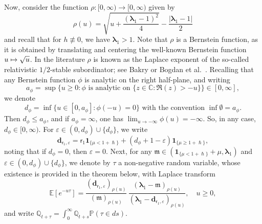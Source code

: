 \documentclass[10pt]{amsart}
\let\epsilon\varepsilon
\newcommand\mto{\mathchoice{\longmapsto}{\mapsto}{\mapsto}{\mapsto}}
\theoremstyle{plain}
\theoremstyle{definition}
\newcommand{\E}{\mathbb{E}}
\newcommand{\Prob}{\mathbb{P}}
\newcommand{\J}{\mathds{Q}}
\newcommand{\m}{\mathfrak{m}}
\newcommand{\dpt}{\bm{d}_{\vat,\epsilon}}
\newcommand{\dph}{(d_\phi+1-\epsilon)}
\newcommand{\lam}{{\bm{\lambda}_1}}
\newcommand{\vat}{{\mathsf{r}_1}}
\let\h\hslash
\let\mo\mu
\begin{document}
Now, consider the function $\rho:[0,\infty) \to [0,\infty)$ given by
\begin{equation*}
\rho(u) = \sqrt{u+\frac{(\lam-1)^2}{4}}-\frac{\left|\lam-1\right|}{2}
\end{equation*}
and recall that for $h \not\equiv 0$, we have $\lam > 1$. Note that $\rho$ is a Bernstein function, as it is obtained by translating and centering the well-known Bernstein function $u \mto \sqrt{u}$. In the literature $\rho$ is known as the Laplace exponent of the so-called relativistic $1/2$-stable subordinator; see Bakry \cite{Bakry-relativistic} or Bogdan et al.~\cite{Potential2009}. Recalling that any Bernstein function $\phi$ is analytic on the right half-plane, and writing
\[
a_\phi=\sup\bigl\{u \ge 0 : \phi \textrm{ is analytic on } \{z \in \mathbb C : \Re(z)>-u\}\bigr\} \in [0,\infty],
\]
we denote
\begin{equation}
\label{eq:dphi}
d_{\phi} = \inf\{u \in [0,a_\phi] : \phi(-u)=0 \} \mbox{ with the convention }\inf \emptyset = a_{\phi}.
\end{equation}
Then $d_{\phi} \le a_{\phi}$, and if $a_{\phi} = \infty$, one has $\lim_{u \to - \infty} \phi(u) = - \infty$.
So, in any case, $d_{\phi} \in [0, \infty)$. For $\epsilon \in (0,d_\phi) \cup \{d_\phi\}$, we write
\begin{equation}
\label{eq:def-dtheta}
\dpt = \vat \bm{1}_{\{ \mo < 1+\h \}}+ \dph\bm{1}_{\{ \mo \geq 1+\h \}},
\end{equation}
noting that if $d_\phi=0$, then $\epsilon = 0$. Next, for any $\m \in (\bm{1}_{\{\mo < 1+\h\}} + \mo , \lam)$ and $\epsilon \in (0,d_\phi) \cup \{d_\phi\}$, we denote by $\tau$ a non-negative random variable, whose existence is provided in the theorem below, with Laplace transform
\begin{equation}
\label{eq:def-T-Laplace}
\E\left[e^{-u \tau}\right] = \frac{(\dpt)_{\rho(u)}}{(\m)_{\rho(u)}}\, \frac{(\lam-\m)_{\rho(u)}}{(\lam-\dpt)_{\rho(u)}} , \quad u \geq 0,
\end{equation}
and write $\J_{t+\tau} = \int_0^\infty \J_{t+s} \Prob(\tau \in ds)$.
\end{document}
